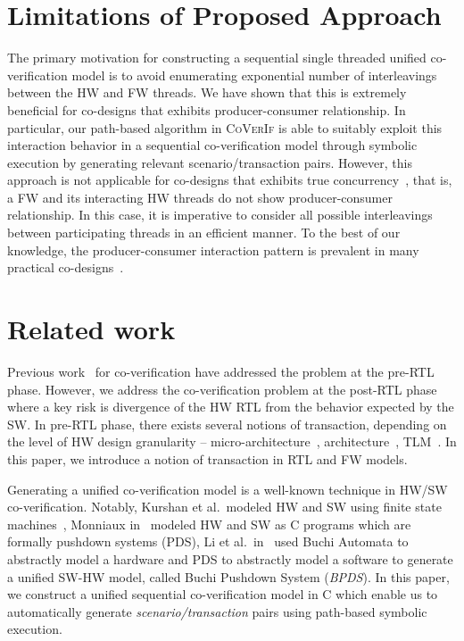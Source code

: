 \documentclass[sigconf]{acmart}
\newcommand{\tool}[1]{\textsc{#1}\xspace}
\newcommand{\verifox}{\tool{CoVerIf}}
\begin{document}
\section{Limitations of Proposed Approach}
The primary motivation for constructing a sequential single threaded unified 
co-verification model is to avoid enumerating exponential number of interleavings 
between the HW and FW threads.  We have shown that this is extremely beneficial for 
co-designs that exhibits producer-consumer relationship.  
In particular, our path-based algorithm in \verifox is able to suitably exploit 
this interaction behavior in a sequential co-verification model through symbolic 
execution by generating relevant scenario/transaction pairs.  However, this approach 
is not applicable for co-designs that exhibits true concurrency~\cite{codesign}, 
that is, a FW and its interacting HW threads do not show producer-consumer relationship.  
In this case, it is imperative to consider all possible interleavings between participating 
threads in an efficient manner.  To the best of our knowledge, the producer-consumer 
interaction pattern is prevalent in many practical 
co-designs~\cite{polig2014micro,polig2014fpl,giefers2015accelerating,hvc}. 


\section{Related work}

Previous work~\cite{codes14,codes15,fmcad13,memocode06} for 
co-verification have addressed the problem at the pre-RTL phase. 
However, we address the co-veri\-fi\-cation problem at the post-RTL
phase~\cite{fase10,vlsid13} where a key risk is divergence of the 
HW RTL from the behavior expected by the SW. In pre-RTL phase, 
there exists several notions of transaction, depending on the level 
of HW design granularity -- micro-architecture~\cite{mcbmq},
architecture~\cite{mcbmq}, TLM~\cite{tlm-book,hvc}. In this paper, 
we introduce a notion of transaction in RTL and FW models.      

Generating a unified co-verification model is a well-known 
technique in HW/SW co-verification.  Notably, Kurshan et al.~modeled HW and 
SW using finite state machines~\cite{fmsd02}, Monniaux in~\cite{emsoft07} modeled
HW and SW as C programs which are formally pushdown systems (PDS), 
Li et al.~in~\cite{fase10} used Buchi Automata to abstractly
model a hardware and PDS to abstractly model a software to generate a unified SW-HW model, 
called Buchi Pushdown System ({\em BPDS}).  In this paper, we construct a unified 
sequential co-verification model in C which enable us to automatically 
generate {\em scenario/transaction} pairs using path-based symbolic execution. 
\end{document}
